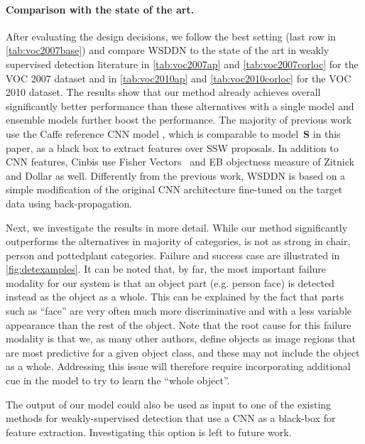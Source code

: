 \documentclass[10pt,twocolumn,letterpaper]{article}
\begin{document}
\paragraph{Comparison with the state of the art.}
After evaluating the design decisions, we follow the best setting (last row in \cref{tab:voc2007base}) and compare WSDDN to the state of the art in weakly supervised detection literature in \cref{tab:voc2007ap} and \cref{tab:voc2007corloc} for the VOC 2007 dataset and in \cref{tab:voc2010ap} and \cref{tab:voc2010corloc} for the VOC 2010 dataset. The results show that our method already achieves overall significantly better performance than these alternatives with a single model and ensemble models further boost the performance. The majority of previous work \cite{Song14,Song14a,Bilen14,Wang14,Bilen15} use the Caffe reference CNN model \cite{Jia13}, which is comparable to model~\textbf{S} in this paper, as a black box to extract features over SSW proposals. In addition to CNN features, Cinbis \etal\cite{Cinbis15} use Fisher Vectors~\cite{Perronnin10a} and EB objectness measure of Zitnick and Dollar \cite{Zitnick14} as well. Differently from the previous work, WSDDN is based on a simple modification of the original CNN architecture fine-tuned on the target data using back-propagation.

Next, we investigate the results in more detail. While our method significantly outperforms the alternatives in majority of categories, is not as strong in chair, person and pottedplant categories. Failure and success case are illustrated in \cref{fig:detexamples}. It can be noted that, by far, the most important failure modality for our system is that an object part (e.g. person face) is detected instead as the object as a whole. This can be explained by the fact that parts such as ``face'' are very often much more discriminative and with a less variable appearance than the rest of the object. Note that the root cause for this failure modality is that we, as many other authors, define objects as image regions that are most predictive for a given object class, and these may not include the object as a whole. Addressing this issue will therefore require incorporating additional cue in the model to try to learn the ``whole object''.

The output of our model could also be used as input to one of the existing methods for weakly-supervised detection that use a CNN as a black-box for feature extraction. Investigating this option is left to future work.
\end{document}
